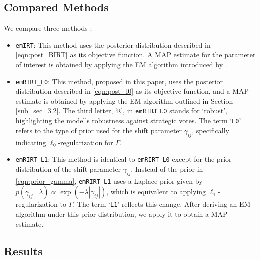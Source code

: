 \documentclass[11pt]{article}
\begin{document}
\subsection{Compared Methods}\label{sub_sec_5.2}
We compare three methods :
\begin{itemize}
    \item \texttt{emIRT}: This method uses the posterior distribution described in \eqref{eqn:post_BIRT} as its objective function. A MAP estimate for the parameter of interest is obtained by applying the EM algorithm introduced by \cite{Imai2016}.

    \item \texttt{emRIRT\_L0}: This method, proposed in this paper, uses the posterior distribution described in \eqref{eqn:post_l0} as its objective function, and a MAP estimate is obtained by applying the EM algorithm outlined in Section \ref{sub_sec_3.2}. The third letter, `\texttt{R}', in $\texttt{emRIRT\_L0}$ stands for `robust', highlighting the model's robustness against strategic votes. The term `\texttt{L0}' refers to the type of prior used for the shift parameter $ \gamma_{ij} $, specifically indicating $ \ell_0 $-regularization for $ \Gamma $.

    \item \texttt{emRIRT\_L1}: This method is identical to \texttt{emRIRT\_L0} except for the prior distribution of the shift parameter $ \gamma_{ij} $. Instead of the prior in \eqref{eqn:prior_gamma}, \texttt{emRIRT\_L1} uses a Laplace prior given by $p(\gamma_{ij} \mid \lambda) \propto \exp\left(-\lambda|\gamma_{ij}|\right)$,
    which is equivalent to applying $ \ell_1 $-regularization to $ \Gamma $. The term `\texttt{L1}' reflects this change. After deriving an EM algorithm under this prior distribution, we apply it to obtain a MAP estimate.
\end{itemize}
 

\subsection{Results}
\end{document}
